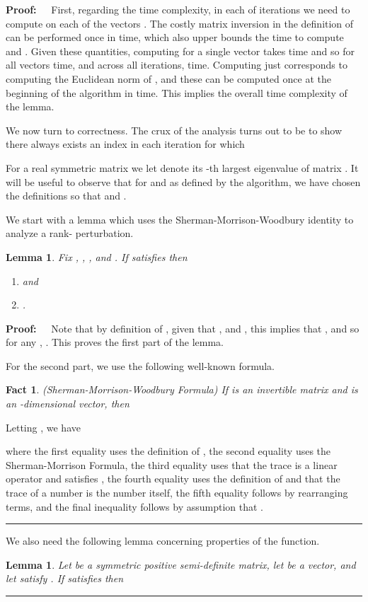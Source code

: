 \documentclass[11pt]{article}
\newtheorem{lemma}[theorem]{Lemma}
\newenvironment{proof}{\begin{trivlist} \item {\bf Proof:~~}}
  {\qed\end{trivlist}}
\def\qed{\hfill\rule{2mm}{2mm}}
\newtheorem{fact}{Fact}
\begin{document}
\begin{proof}
First, regarding the time complexity, 
in each of  iterations we need to compute  on each of the  vectors . The costly matrix
inversion in the definition of  can be performed once in  time, which also upper bounds
the time to compute  and . Given these quantities, 
computing  for a single vector  takes  time and so for all  vectors 
 time, and across all  iterations,  time. Computing 
just corresponds to computing the Euclidean norm of , and these can be computed once at the
beginning of the algorithm in  time. This implies the overall time complexity of the lemma.

We now turn to correctness. The crux of the analysis turns out to be 
to show there always exists an index 
in each iteration for which 
 

For a real symmetric matrix  we let  denote 
its -th largest eigenvalue of matrix . It will be 
useful to observe that for  and  as defined by the algorithm, we have chosen the
definitions so that  and . 

We start with a lemma which uses the 
Sherman-Morrison-Woodbury identity to analyze a rank- perturbation. 
\begin{lemma}\label{lem:bss}
Fix , , , and . If
 satisfies  
then 
\begin{enumerate}
\item  and
\item . 
\end{enumerate} 
\end{lemma}
\begin{proof}
Note that by definition of , given that , 
and , this implies that , and so
for any , . This proves the first part of the lemma.

For the second part, we use the following well-known formula.
\begin{fact}(Sherman-Morrison-Woodbury Formula)
If  is an invertible  matrix and  is an -dimensional vector, then

\end{fact}

Letting , we have

where the first equality uses the definition of , the second equality
uses the Sherman-Morrison Formula, the third equality uses that the trace is a linear operator
and satisfies , 
the fourth equality
uses the definition of  and that the trace of a number is the number itself, the fifth
equality follows by rearranging terms, and the final inequality follows by assumption
that . 
\end{proof}
We also need the following lemma concerning properties of the  function.  
\begin{lemma}\label{lem:U}
Let  be a symmetric positive semi-definite matrix, let 
 be a vector, and let  satisfy . If  
satisfies  
then


\end{lemma}
\end{proof}
\end{document}
